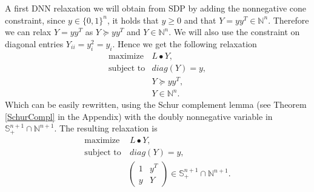 \documentclass[12pt]{book}
\theoremstyle{definition}
\begin{document}
A first DNN relaxation we will obtain from SDP by adding the nonnegative cone constraint, since $y\in\{0,1\}^n$, it holds that $y\geq 0$ and that $Y = yy^T \in \mathbb{N}^n$. 
Therefore we can relax $Y = yy^T$ as $Y\succeq yy^T$ and $Y\in\mathbb{N}^n$.
We will also use the constraint on diagonal entries $Y_{ii} = y_i^2 = y_i$. Hence we get the following relaxation
\begin{equation*}
\begin{array}{ll}
\mbox{maximize} & L\bullet Y, \\
\mbox{subject to} & diag(Y) = y , \\
				& Y\succeq yy^T, \\
				& Y\in\mathbb{N}^n.
\end{array}	
\end{equation*}
Which can be easily rewritten, using the Schur complement lemma (see Theorem \ref{SchurCompl} in the Appendix) with the doubly nonnegative variable in $ \mathbb{S}^{n+1}_+ \cap \mathbb{N}^{n+1}$. 
The resulting relaxation is 
\begin{equation}
\label{MaxCutDNNRelax1}
\begin{array}{ll}
\mbox{maximize} & \ L\bullet Y, \\
\mbox{subject to} & \ diag(Y) = y , \\
				& \left(\begin{array}{ll} 1 & y^T \\ y & Y \end{array}\right)\in\mathbb{S}^{n+1}_+ \cap \mathbb{N}^{n+1}.
\end{array}	
\end{equation}
\end{document}

